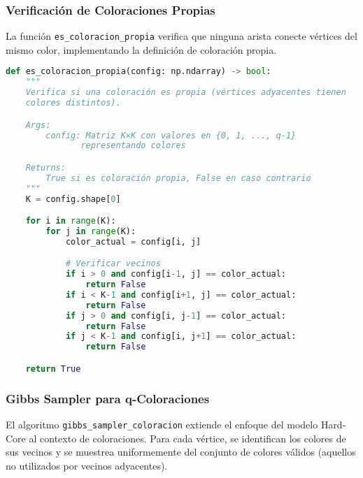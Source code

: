 \subsubsection{Verificación de Coloraciones Propias}

La función \texttt{es\_coloracion\_propia} verifica que ninguna arista conecte vértices del mismo color, implementando la definición de coloración propia.

\begin{lstlisting}[language=Python]
def es_coloracion_propia(config: np.ndarray) -> bool:
    """
    Verifica si una coloración es propia (vértices adyacentes tienen
    colores distintos).

    Args:
        config: Matriz K×K con valores en {0, 1, ..., q-1}
               representando colores

    Returns:
        True si es coloración propia, False en caso contrario
    """
    K = config.shape[0]

    for i in range(K):
        for j in range(K):
            color_actual = config[i, j]

            # Verificar vecinos
            if i > 0 and config[i-1, j] == color_actual:
                return False
            if i < K-1 and config[i+1, j] == color_actual:
                return False
            if j > 0 and config[i, j-1] == color_actual:
                return False
            if j < K-1 and config[i, j+1] == color_actual:
                return False

    return True
\end{lstlisting}

\subsubsection{Gibbs Sampler para q-Coloraciones}

El algoritmo \texttt{gibbs\_sampler\_coloracion} extiende el enfoque del modelo Hard-Core al contexto de coloraciones. Para cada vértice, se identifican los colores de sus vecinos y se muestrea uniformemente del conjunto de colores válidos (aquellos no utilizados por vecinos adyacentes).

